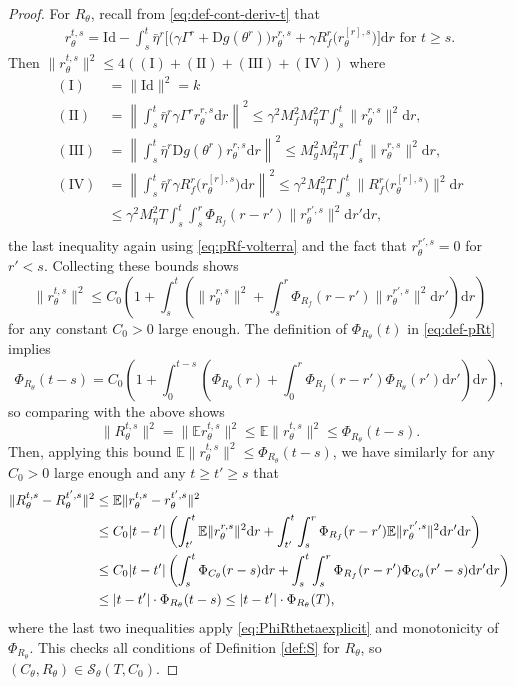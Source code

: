\documentclass[10pt,a4paper]{amsart}
\def\Ct{C_\theta}
\def\D{\mathrm{D}}
\def\E{\mathbb{E}}
\def\Id{\mathrm{Id}}
\def\Rt{R_\theta}
\def\d{\mathrm{d}}
\def\nI{(\mathrm{I})}
\def\nII{(\mathrm{II})}
\def\nIII{(\mathrm{III})}
\def\nIV{(\mathrm{IV})}
\newcommand{\norm}[1]{\|#1\|}
\def\pCt{\Phi_{\Ct}}
\def\pRt{\Phi_{\Rt}}
\begin{document}
\begin{proof}
For $R_\theta$, recall from \eqref{eq:def-cont-deriv-t} that
\begin{align}\label{eq:rthetarestate}
r_\theta^{t,s}=\Id-\int_s^t \bar\eta^r\bigg[\Big({\gamma}\Gamma^r+\D
g(\theta^r)\Big)r_\theta^{r,s}+{\gamma}
R_f^r\Big(r_\theta^{[r],s}\Big)\bigg]\d r \text{ for } t \geq s.
\end{align}
Then $\|r_\theta^{t,s}\|^2 \leq 4(\nI+\nII+\nIII+\nIV)$ where
\begin{align*}
\nI&=\|\Id\|^2=k\\
\nII&=\left\|\int_s^t \bar\eta^r\gamma\Gamma^r r_\theta^{r,s}\d
r\right\|^2
\leq \gamma^2M_f^2M_\eta^2T\int_s^t \|r_\theta^{r,s}\|^2 \d r,\\
\nIII&=\left\|\int_s^t \bar\eta^r \D g(\theta^r)r_\theta^{r,s}\d
r\right\|^2
\leq M_g^2 M_\eta^2 T\int_s^t \|r_\theta^{r,s}\|^2 \d r,\\
\nIV&=\left\|\int_s^t \bar\eta^r \gamma R_f^r\Big(r_\theta^{[r],s}\Big)\d
r\right\|^2
\leq \gamma^2 M_\eta^2 T\int_s^t
\Big\|R_f^r\Big(r_\theta^{[r],s}\Big)\Big\|^2 \d r\\
&\leq \gamma^2 M_\eta^2 T\int_s^t \int_s^r \Phi_{R_f}(r-r')
\|r_\theta^{r',s}\|^2 \d r'\d r,\\
\end{align*}
the last inequality again using \eqref{eq:pRf-volterra} and the fact that
$r_\theta^{r',s}=0$ for $r'<s$. Collecting these bounds shows
\[\|r_\theta^{t,s}\|^2
\leq C_0\left(1+\int_s^t \left(\norm{r_\theta^{r,s}}^2
+\int_s^r \Phi_{R_f}(r-r')\|r_\theta^{r',s}\|^2\d r'\right) \d r\right)\]
for any constant $C_0>0$ large enough.
The definition of $\Phi_{R_\theta}(t)$ in \eqref{eq:def-pRt} implies
\begin{equation}\label{eq:PhiRthetaexplicit}
\Phi_{R_\theta}(t-s)=C_0\left(1+\int_0^{t-s}\left(
\Phi_{R_\theta}(r)+\int_0^r \Phi_{R_f}(r-r')\Phi_{R_\theta}(r')\d
r'\right)\d r\right),
\end{equation}
so comparing with the above shows
\[\|R_\theta^{t,s}\|^2=\|\E r_\theta^{t,s}\|^2\leq \E\|r_\theta^{t,s}\|^2
\leq \Phi_{R_\theta}(t-s).\]
Then, applying this bound
$\E\|r_\theta^{t,s}\|^2 \leq \Phi_{R_\theta}(t-s)$,
we have similarly for any $C_0>0$ large enough and any $t \geq t' \geq s$ that
\begin{align}
\|R_\theta^{t,s}-R_\theta^{t',s}\|^2
&\leq \E\|r_\theta^{t,s}-r_\theta^{t',s}\|^2\notag\\
&\leq C_0|t-t'|\left(\int_{t'}^t \E\|r_\theta^{r,s}\|^2 \d r
+\int_{t'}^t \int_s^r \Phi_{R_f}(r-r')\E \|r_\theta^{r',s}\|^2 \d r' \d
r\right)\notag\\
&\leq C_0|t-t'|\left(\int_s^t \pCt(r-s)\d r
+\int_s^t \int_s^r \Phi_{R_f}(r-r')\pCt(r'-s)\d r' \d
r\right)\notag\\
&\leq |t-t'| \cdot \pRt(t-s) \leq |t-t'| \cdot \pRt(T),\label{eq:Rcontbound}
\end{align}
where the last two inequalities apply \eqref{eq:PhiRthetaexplicit} and
monotonicity of $\pRt$.
This checks all conditions of Definition \ref{def:S} for $R_\theta$, so
$(\Ct,\Rt) \in {\mathcal{S}}_\theta(T,C_0)$.


\end{proof}
\end{document}
